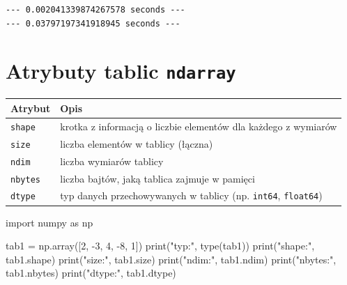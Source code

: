 \documentclass[
  polish,
  letterpaper,
  DIV=11,
  numbers=noendperiod]{scrreprt}
\newenvironment{Shaded}{\begin{snugshade}}{\end{snugshade}}
\newcommand{\BuiltInTok}[1]{\textcolor[rgb]{0.00,0.23,0.31}{#1}}
\newcommand{\DecValTok}[1]{\textcolor[rgb]{0.68,0.00,0.00}{#1}}
\newcommand{\ImportTok}[1]{\textcolor[rgb]{0.00,0.46,0.62}{#1}}
\newcommand{\NormalTok}[1]{\textcolor[rgb]{0.00,0.23,0.31}{#1}}
\newcommand{\OperatorTok}[1]{\textcolor[rgb]{0.37,0.37,0.37}{#1}}
\newcommand{\StringTok}[1]{\textcolor[rgb]{0.13,0.47,0.30}{#1}}
\newcounter{none} %
\begin{document}
\begin{verbatim}
--- 0.002041339874267578 seconds ---
--- 0.03797197341918945 seconds ---
\end{verbatim}

\chapter{\texorpdfstring{Atrybuty tablic
\texttt{ndarray}}{Atrybuty tablic ndarray}}\label{atrybuty-tablic-ndarray}

{\def\LTcaptype{none} %
\begin{longtable}[]{@{}
  >{\raggedright\arraybackslash}p{}
  >{\raggedright\arraybackslash}p{}@{}}
\toprule\noalign{}
\begin{minipage}[b]{\linewidth}\raggedright
Atrybut
\end{minipage} & \begin{minipage}[b]{\linewidth}\raggedright
Opis
\end{minipage} \\
\midrule\noalign{}
\endhead
\bottomrule\noalign{}
\endlastfoot
\texttt{shape} & krotka z informacją o liczbie elementów dla każdego z
wymiarów \\
\texttt{size} & liczba elementów w tablicy (łączna) \\
\texttt{ndim} & liczba wymiarów tablicy \\
\texttt{nbytes} & liczba bajtów, jaką tablica zajmuje w pamięci \\
\texttt{dtype} & typ danych przechowywanych w tablicy (np.
\texttt{int64}, \texttt{float64}) \\
\end{longtable}
}

\begin{Shaded}
\begin{Highlighting}[]
\ImportTok{import}\NormalTok{ numpy }\ImportTok{as}\NormalTok{ np}

\NormalTok{tab1 }\OperatorTok{=}\NormalTok{ np.array([}\DecValTok{2}\NormalTok{, }\OperatorTok{{-}}\DecValTok{3}\NormalTok{, }\DecValTok{4}\NormalTok{, }\OperatorTok{{-}}\DecValTok{8}\NormalTok{, }\DecValTok{1}\NormalTok{])}
\BuiltInTok{print}\NormalTok{(}\StringTok{"typ:"}\NormalTok{, }\BuiltInTok{type}\NormalTok{(tab1))}
\BuiltInTok{print}\NormalTok{(}\StringTok{"shape:"}\NormalTok{, tab1.shape)}
\BuiltInTok{print}\NormalTok{(}\StringTok{"size:"}\NormalTok{, tab1.size)}
\BuiltInTok{print}\NormalTok{(}\StringTok{"ndim:"}\NormalTok{, tab1.ndim)}
\BuiltInTok{print}\NormalTok{(}\StringTok{"nbytes:"}\NormalTok{, tab1.nbytes)}
\BuiltInTok{print}\NormalTok{(}\StringTok{"dtype:"}\NormalTok{, tab1.dtype)}
\end{Highlighting}
\end{Shaded}
\end{document}
